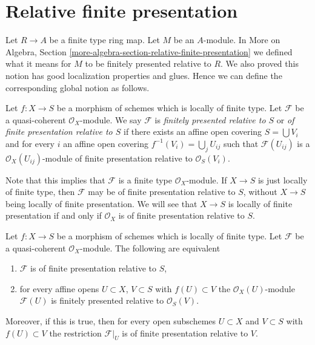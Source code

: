 \section{Relative finite presentation}
\label{section-finite-type-finite-presentation}

\noindent
Let $R \to A$ be a finite type ring map. Let $M$ be an $A$-module. In
More on Algebra,
Section \ref{more-algebra-section-relative-finite-presentation}
we defined what it means for $M$ to be finitely presented relative to $R$.
We also proved this notion has good localization properties and glues.
Hence we can define the corresponding global notion as follows.

\begin{definition}
\label{definition-relatively-finitely-presented-sheaf}
Let $f : X \to S$ be a morphism of schemes which is locally of finite type.
Let $\mathcal{F}$ be a quasi-coherent $\mathcal{O}_X$-module. We say
$\mathcal{F}$ is {\it finitely presented relative to $S$} or
{\it of finite presentation relative to $S$}
if there exists an affine open covering $S = \bigcup V_i$ and
for every $i$ an affine open covering
$f^{-1}(V_i) = \bigcup_j U_{ij}$ such that $\mathcal{F}(U_{ij})$
is a $\mathcal{O}_X(U_{ij})$-module of finite presentation relative
to $\mathcal{O}_S(V_i)$.
\end{definition}

\noindent
Note that this implies that $\mathcal{F}$ is a finite type
$\mathcal{O}_X$-module. If $X \to S$ is just locally of finite
type, then $\mathcal{F}$ may be of finite presentation relative
to $S$, without $X \to S$ being locally of finite presentation.
We will see that $X \to S$ is locally of finite presentation if
and only if $\mathcal{O}_X$ is of finite presentation relative to $S$.

\begin{lemma}
\label{lemma-relative-finite-presentation-characterize}
Let $f : X \to S$ be a morphism of schemes which is locally of finite type.
Let $\mathcal{F}$ be a quasi-coherent $\mathcal{O}_X$-module. The following
are equivalent
\begin{enumerate}
\item $\mathcal{F}$ is of finite presentation relative to $S$,
\item for every affine opens $U \subset X$, $V \subset S$
with $f(U) \subset V$ the $\mathcal{O}_X(U)$-module $\mathcal{F}(U)$
is finitely presented relative to $\mathcal{O}_S(V)$.
\end{enumerate}
Moreover, if this is true, then for every open subschemes
$U \subset X$ and $V \subset S$ with $f(U) \subset V$
the restriction $\mathcal{F}|_U$ is of finite presentation relative to $V$.
\end{lemma}

